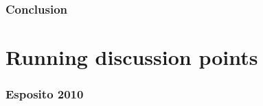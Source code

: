 \documentclass[12pt, letterpaper]{article}
\begin{document}
\section{Conclusion} \label{sec:Conclusion}


\part{Running discussion points} \label{part:OutsideOutline}

\section{Esposito 2010} \label{sec:Esposito}
\end{document}
